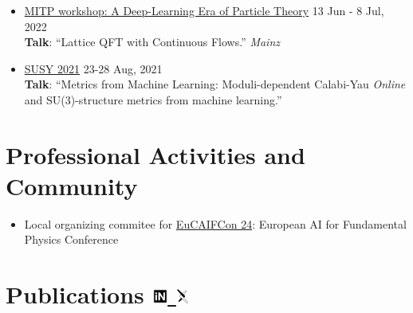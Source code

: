 \documentclass[11pt, a4paper]{article}
\newcommand{\dateright}[1]{\hfill{\small\color{accentblue} #1}}
\begin{document}
\begin{itemize}[resume, itemsep=5pt]
    \item {\href{https://indico.mitp.uni-mainz.de/event/254/overview}{MITP workshop: A Deep-Learning Era of Particle Theory}} \dateright{ 13 Jun - 8 Jul, 2022} \\
    {\footnotesize \textbf{Talk}: “Lattice QFT with Continuous Flows.”} \dateright{{\color{black}\textit{Mainz}}}

    \item {\href{https://indico.cern.ch/event/875077/contributions/4481976/}{SUSY 2021}} \dateright{ 23-28 Aug, 2021} \\
    {\footnotesize \textbf{Talk}: “Metrics from Machine Learning: Moduli-dependent Calabi-Yau} \dateright{{\color{black}\textit{Online}}}\\
    {\footnotesize and SU(3)-structure metrics from machine learning.”}

\end{itemize}

\section*{Professional Activities and Community}
\begin{itemize}[left=0pt, itemsep=3pt]
    \item Local organizing commitee for \href{https://www.aanmelder.nl/eucaifcon24}{EuCAIFCon 24}: European AI for Fundamental Physics Conference
\end{itemize}


\section*{Publications \hfill
{ \small
\href{https://inspirehep.net/authors/2107097}{\includegraphics[height=14pt]{inspire.pdf} \hspace*{-7pt} } \hspace*{10pt}
\href{https://arxiv.org/a/gerdes_m_1.html}{\includegraphics[height=14pt]{arxiv.pdf} \hspace*{-10pt} }
}
}
\end{document}
